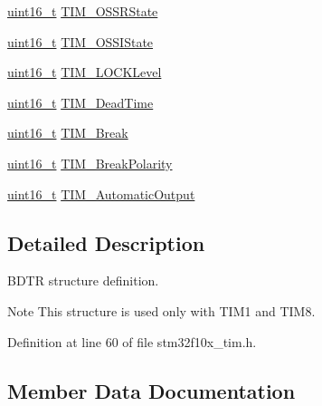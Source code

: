 \begin{DoxyCompactItemize}
\item 
\hyperlink{_p_e___types_8h_a1f1825b69244eb3ad2c7165ddc99c956}{uint16\+\_\+t} \hyperlink{struct_t_i_m___b_d_t_r_init_type_def_a8f34ad7bc4764bd3ff372cadde468072}{T\+I\+M\+\_\+\+O\+S\+S\+R\+State}
\item 
\hyperlink{_p_e___types_8h_a1f1825b69244eb3ad2c7165ddc99c956}{uint16\+\_\+t} \hyperlink{struct_t_i_m___b_d_t_r_init_type_def_ad8891e3739a7db8a45343d4e2f9d2824}{T\+I\+M\+\_\+\+O\+S\+S\+I\+State}
\item 
\hyperlink{_p_e___types_8h_a1f1825b69244eb3ad2c7165ddc99c956}{uint16\+\_\+t} \hyperlink{struct_t_i_m___b_d_t_r_init_type_def_aa5296a7b194d25b16899f6a98da01f03}{T\+I\+M\+\_\+\+L\+O\+C\+K\+Level}
\item 
\hyperlink{_p_e___types_8h_a1f1825b69244eb3ad2c7165ddc99c956}{uint16\+\_\+t} \hyperlink{struct_t_i_m___b_d_t_r_init_type_def_a01ccbaffccdb3068b8a60c912579b1a2}{T\+I\+M\+\_\+\+Dead\+Time}
\item 
\hyperlink{_p_e___types_8h_a1f1825b69244eb3ad2c7165ddc99c956}{uint16\+\_\+t} \hyperlink{struct_t_i_m___b_d_t_r_init_type_def_a9fcf20632d0377727476a98f7183be56}{T\+I\+M\+\_\+\+Break}
\item 
\hyperlink{_p_e___types_8h_a1f1825b69244eb3ad2c7165ddc99c956}{uint16\+\_\+t} \hyperlink{struct_t_i_m___b_d_t_r_init_type_def_a5731e4e786b66f35cfe4798d6157619e}{T\+I\+M\+\_\+\+Break\+Polarity}
\item 
\hyperlink{_p_e___types_8h_a1f1825b69244eb3ad2c7165ddc99c956}{uint16\+\_\+t} \hyperlink{struct_t_i_m___b_d_t_r_init_type_def_a6c056e29af67fd8a32919104ea48eea2}{T\+I\+M\+\_\+\+Automatic\+Output}
\end{DoxyCompactItemize}


\subsection{Detailed Description}
B\+D\+TR structure definition. 

\begin{DoxyNote}{Note}
This structure is used only with T\+I\+M1 and T\+I\+M8. 
\end{DoxyNote}


Definition at line 60 of file stm32f10x\+\_\+tim.\+h.



\subsection{Member Data Documentation}
